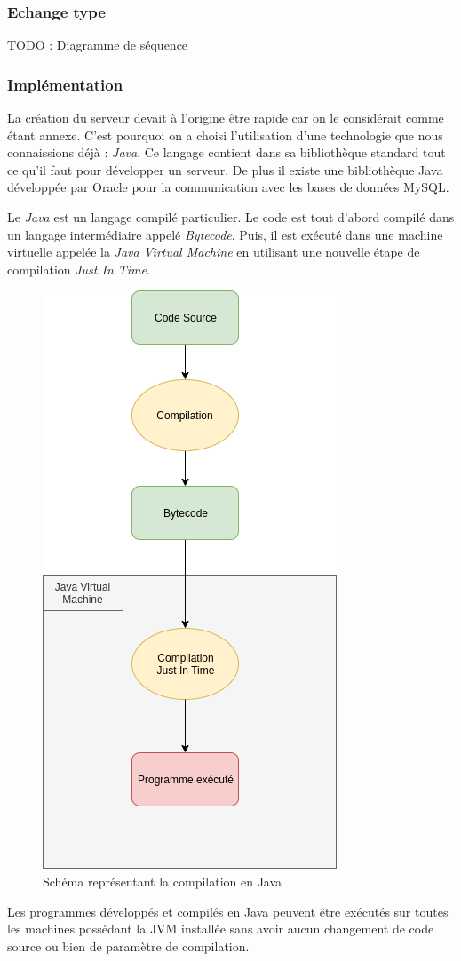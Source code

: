\subsubsection{Echange type}
TODO : Diagramme de séquence

\subsubsection{Implémentation}
La création du serveur devait à l'origine être rapide car on le considérait comme étant annexe. C'est pourquoi on a choisi l'utilisation d'une
technologie que nous connaissions déjà : \emph{Java}. Ce langage contient dans sa bibliothèque standard tout ce qu'il faut pour développer un serveur.
De plus il existe une bibliothèque Java développée par Oracle pour la communication avec les bases de données MySQL.

Le \emph{Java} est un langage compilé particulier. Le code est tout d'abord compilé dans un langage intermédiaire appelé \emph{Bytecode}. 
Puis, il est exécuté dans une machine virtuelle appelée la \emph {Java Virtual Machine} en utilisant une nouvelle étape de compilation \emph {Just In Time}.
\par
\begin{figure}[ht]
    \label{Schéma compilation Java}
    \centering
    \includegraphics[scale=0.5]{images/java_compilation.png}
    \caption{Schéma représentant la compilation en Java}
\end{figure}
Les programmes développés et compilés en Java peuvent être exécutés sur toutes les machines possédant la JVM installée sans avoir aucun changement de code source ou bien de paramètre de compilation.
